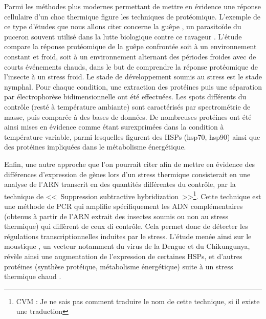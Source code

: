 		Parmi les méthodes plus modernes permettant de mettre en évidence une réponse cellulaire d'un choc thermique figure les techniques de protéomique.
		L'exemple de ce type d'études que nous allons citer concerne la guêpe , un parasitoïde du puceron souvent utilisé dans la lutte biologique contre ce ravageur \cite{colinet2007}.
		L'étude compare la réponse protéomique de la guêpe confrontée soit à un environnement constant et froid, soit à un environnement alternant des périodes froides avec de courts événements chauds, dans le but de comprendre la réponse protéomique de l'insecte à un stress froid.
		Le stade de développement soumis au stress est le stade nymphal.
		Pour chaque condition, une extraction des protéines puis une séparation par électrophorèse bidimensionnelle ont été effectuées.
		Les spots différents du contrôle (resté à température ambiante) sont caractérisés par spectrométrie de masse, puis comparée à des bases de données.
		De nombreuses protéines ont été ainsi mises en évidence comme étant surexprimées dans la condition à température variable, parmi lesquelles figurent des HSPs (hsp70, hsp90) ainsi que des protéines impliquées dans le métabolisme énergétique.


		Enfin, une autre approche que l'on pourrait citer afin de mettre en évidence des différences d'expression de gènes lors d'un stress thermique consisterait en une analyse de l'ARN transcrit en des quantités différentes du contrôle, par la technique de <<~Suppression subtractive hybridization~>>\footnote{CVM : Je ne sais pas comment traduire le nom de cette technique, si il existe une traduction}.
		Cette technique est une méthode de PCR qui amplifie spécifiquement les ADN complémentaires (obtenus à partir de l'ARN extrait des insectes soumis ou non au stress thermique) qui diffèrent de ceux di contrôle.
		Cela permet donc de détecter les régulations transcriptionnelles induites par le stress.
		L'étude menée ainsi sur le moustique , un vecteur notamment du virus de la Dengue et du Chikungunya, révèle ainsi une augmentation de l'expression de certaines HSPs, et d'autres protéines (synthèse protéique, métabolisme énergétique) suite à un stress thermique chaud .


